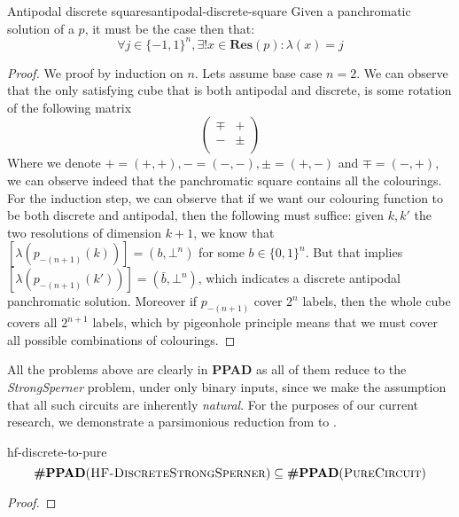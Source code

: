 \begin{claimbox}{Antipodal discrete squares}{antipodal-discrete-square}
    Given a panchromatic solution of a  $p$, it must be the case then that:
    $$
    \forall j \in \{-1, 1\}^n, \exists! x \in \textbf{Res}(p): \lambda(x) =  j
    $$
\end{claimbox}

\begin{proof}
We proof by induction on $n$. Lets assume base case $n = 2$. We can observe that the only satisfying 
cube that is both antipodal and discrete, is some rotation of the following matrix
$$
\begin{pmatrix}
    \mp & + \\
    - & \pm \\
\end{pmatrix}
$$
Where we denote $+ = (+, +), -=(-,-), \pm = (+,-)$ and $\mp = (-,+)$, we can observe indeed that the panchromatic square contains all the colourings.
For the induction step, we can observe that if we want our colouring function to be both discrete and antipodal, then the following must suffice:
given $k, k'$ the two resolutions of dimension $k+1$, we know that $[\lambda(p_{-(n+1)}(k))] = (b, \bot^n)$ for some $b \in \{0,1\}^n$. But that implies
$[\lambda(p_{-(n+1)}(k'))] = (\bar{b}, \bot^n)$, which indicates a discrete antipodal panchromatic solution. Moreover if $p_{-(n+1)}$ cover $2^n$ labels,
then the whole cube covers all $2^{n+1}$ labels, which by pigeonhole principle means that we must cover all possible combinations of colourings.
\end{proof}

All the problems above are clearly in \textbf{PPAD} as all of them reduce to the \textit{StrongSperner} problem, under only 
binary inputs, since we make the assumption that all such circuits are inherently \textit{natural}. For the purposes of our current
research, we demonstrate a parsimonious reduction from  to .


\begin{theorembox}{}{hf-discrete-to-pure}
    $$
    \textbf{\#PPAD}(\textnormal{\textsc{HF-DiscreteStrongSperner}}) \subseteq \textbf{\#PPAD}(\textnormal{\textsc{PureCircuit}})
    $$
\end{theorembox}


\begin{proof}
    
\end{proof}


